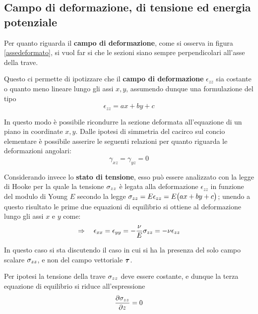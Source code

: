 	\subsection{Campo di deformazione, di tensione ed energia potenziale}
		
		Per quanto riguarda il \textbf{campo di deformazione}, come si osserva in figura \ref{assedeformato}, si vuol far si che le sezioni siano sempre perpendicolari all'asse della trave.
		\begin{concetto}
			Questo ci permette di ipotizzare che il \textbf{campo di deformazione} $\epsilon_{zz}$ sia costante o quanto meno lineare lungo gli assi $x,y$, assumendo dunque una formulazione del tipo
			\[ \epsilon_{zz} = ax + by + c  \]
		\end{concetto}
		In questo modo è possibile ricondurre la sezione deformata all'equazione di un piano in coordinate $x,y$. Dalle ipotesi di simmetria del cacirco sul concio elementare è possibile asserire le seguenti relazioni per quanto riguarda le deformazioni angolari:
		\[ \gamma_{xz} = \gamma_{yz} = 0  \]
		
		Considerando invece lo \textbf{stato di tensione}, esso può essere analizzato con la legge di Hooke per la quale la tensione $\sigma_{zz}$ è legata alla deformazione $\epsilon_{zz}$ in funzione del modulo di Young $E$ secondo la legge $ \sigma_{zz} = E\epsilon_{zz} = E\big(ax + by + c\big)$; unendo a questo risultato le prime due equazioni di equilibrio si ottiene al deformazione lungo gli assi $x$ e $y$ come:
		\[ \Rightarrow \quad \epsilon_{xx} = \epsilon_{yy} = - \frac \nu E \sigma_{zz} = - \nu \epsilon_{zz} \]
		
		\begin{nota}
			In questo caso si sta discutendo il caso in cui si ha la presenza del solo campo scalare $\sigma_{zz}$, e non del campo vettoriale $\boldsymbol{\tau}$.
		\end{nota}
		Per ipotesi la tensione della trave $\sigma_{zz}$ deve essere costante, e dunque la terza equazione di equilibrio si riduce all'espressione
		\[ \frac{\partial \sigma_{zz}}{\partial z} = 0 \]
	
	
	
	
	
	
	
	
	
	
	
	
	
	